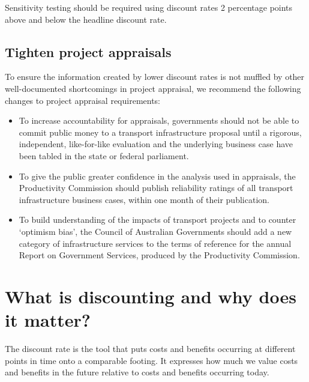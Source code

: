 \documentclass{grattan}
\begin{document}
\begin{recommendations}
Sensitivity testing should be required using discount rates 2 percentage points above and below the headline discount rate.


\section*{Tighten project appraisals}

To ensure the information created by lower discount rates is not muffled by other well-documented shortcomings in project appraisal, we recommend the following changes to project appraisal requirements:

\begin{itemize}
\item To increase accountability for appraisals, governments should not be able to commit public money to a transport infrastructure proposal until a rigorous, independent, like-for-like evaluation and the underlying business case have been tabled in the state or federal parliament. 
\item To give the public greater confidence in the analysis used in appraisals, the Productivity Commission should publish reliability ratings of all transport infrastructure business cases, within one month of their publication.
\item To build understanding of the impacts of transport projects and to counter `optimism bias', the Council of Australian Governments should add a new category of infrastructure services to the terms of reference for the annual Report on Government Services, produced by the Productivity Commission. 

\end{itemize}




\end{recommendations}



\contentspage
\listoffigures


\chapter{What is discounting and why does it matter?}\label{chap:what-is-discounting}

The discount rate is the tool that puts costs and benefits occurring at different points in time onto a comparable footing. It expresses how much we value costs and benefits in the future relative to costs and benefits occurring today. 
\end{document}
